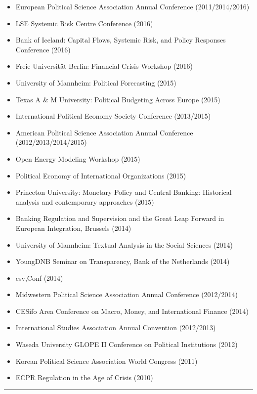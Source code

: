 \documentclass[a4paper]{article}
\begin{document}
{\begin{itemize}
    \item European Political Science Association Annual Conference (2011/2014/2016)
    \item LSE Systemic Risk Centre Conference (2016)
    \item Bank of Iceland: Capital Flows, Systemic Risk, and Policy Responses Conference (2016)
    \item Freie Universit\"{a}t Berlin: Financial Crisis Workshop (2016)
    \item University of Mannheim: Political Forecasting (2015)
    \item Texas A \& M University: Political Budgeting Across Europe (2015)
    \item International Political Economy Society Conference (2013/2015)
    \item American Political Science Association Annual Conference (2012/2013/2014/2015)
    \item Open Energy Modeling Workshop (2015)
    \item Political Economy of International Organizations (2015)
    \item Princeton University: Monetary Policy and Central Banking: Historical analysis and contemporary approaches (2015)
    \item Banking Regulation and Supervision and the Great Leap Forward in European Integration, Brussels (2014)
    \item University of Mannheim: Textual Analysis in the Social Sciences (2014)
    \item YoungDNB Seminar on Transparency, Bank of the Netherlands (2014)
    \item csv,Conf (2014)
    \item Midwestern Political Science Association Annual Conference (2012/2014)
    \item CESifo Area Conference on Macro, Money, and International Finance (2014)
    \item International Studies Association Annual Convention (2012/2013)
    \item Waseda University GLOPE II Conference on Political Institutions (2012)
    \item Korean Political Science Association World Congress (2011)
    \item ECPR Regulation in the Age of Crisis (2010)
\end{itemize}


\vspace{0.25cm}
\medskip\hrule height 1pt
\vspace{0.5cm}

}
\end{document}
